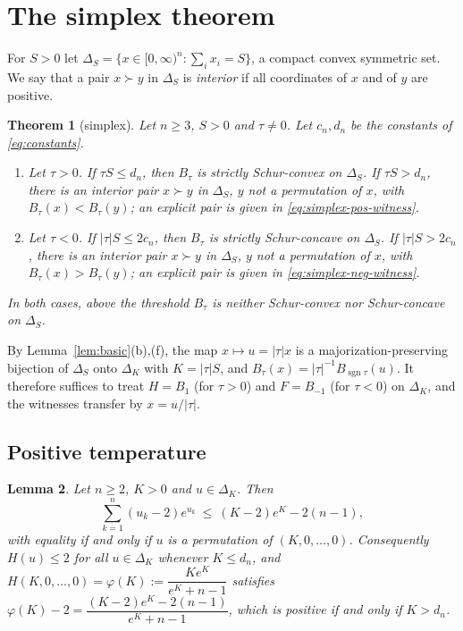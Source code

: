 \documentclass[11pt,a4paper]{article}
\theoremstyle{plain}
\newtheorem{theorem}{Theorem}[section]
\newtheorem{lemma}[theorem]{Lemma}
\theoremstyle{definition}
\DeclareMathOperator{\sgn}{sgn}
\newcommand{\maj}{\succ}
\newcommand{\Simp}{\Delta}
\begin{document}
\section{The simplex theorem}\label{sec:simplex}

For $S>0$ let $\Simp_S=\{x\in[0,\infty)^n:\sum_i x_i=S\}$, a compact convex symmetric set. We say that a pair $x\maj y$ in $\Simp_S$ is \emph{interior} if all coordinates of $x$ and of $y$ are positive.

\begin{theorem}[simplex]\label{thm:simplex}
Let $n\ge 3$, $S>0$ and $\tau\ne 0$. Let $c_n,d_n$ be the constants of \eqref{eq:constants}.
\begin{enumerate}
\item[(i)] Let $\tau>0$. If $\tau S\le d_n$, then $B_\tau$ is strictly Schur-convex on $\Simp_S$. If $\tau S>d_n$, there is an interior pair $x\maj y$ in $\Simp_S$, $y$ not a permutation of $x$, with $B_\tau(x)<B_\tau(y)$; an explicit pair is given in \eqref{eq:simplex-pos-witness}.
\item[(ii)] Let $\tau<0$. If $|\tau|S\le 2c_n$, then $B_\tau$ is strictly Schur-concave on $\Simp_S$. If $|\tau|S>2c_n$, there is an interior pair $x\maj y$ in $\Simp_S$, $y$ not a permutation of $x$, with $B_\tau(x)>B_\tau(y)$; an explicit pair is given in \eqref{eq:simplex-neg-witness}.
\end{enumerate}
In both cases, above the threshold $B_\tau$ is neither Schur-convex nor Schur-concave on $\Simp_S$.
\end{theorem}

By Lemma~\ref{lem:basic}(b),(f), the map $x\mapsto u=|\tau|x$ is a majorization-preserving bijection of $\Simp_S$ onto $\Simp_K$ with $K=|\tau|S$, and $B_\tau(x)=|\tau|^{-1}B_{\sgn\tau}(u)$. It therefore suffices to treat $H=B_1$ (for $\tau>0$) and $F=B_{-1}$ (for $\tau<0$) on $\Simp_K$, and the witnesses transfer by $x=u/|\tau|$.

\subsection{Positive temperature}

\begin{lemma}\label{lem:convexbound}
Let $n\ge 2$, $K>0$ and $u\in\Simp_K$. Then
\begin{equation}\label{eq:convexbound}
\sum_{k=1}^n(u_k-2)e^{u_k}\ \le\ (K-2)e^{K}-2(n-1),
\end{equation}
with equality if and only if $u$ is a permutation of $(K,0,\dots,0)$. Consequently $H(u)\le 2$ for all $u\in\Simp_K$ whenever $K\le d_n$, and $H(K,0,\dots,0)=\varphi(K):=\dfrac{Ke^{K}}{e^{K}+n-1}$ satisfies $\varphi(K)-2=\dfrac{(K-2)e^{K}-2(n-1)}{e^{K}+n-1}$, which is positive if and only if $K>d_n$.
\end{lemma}
\end{document}
